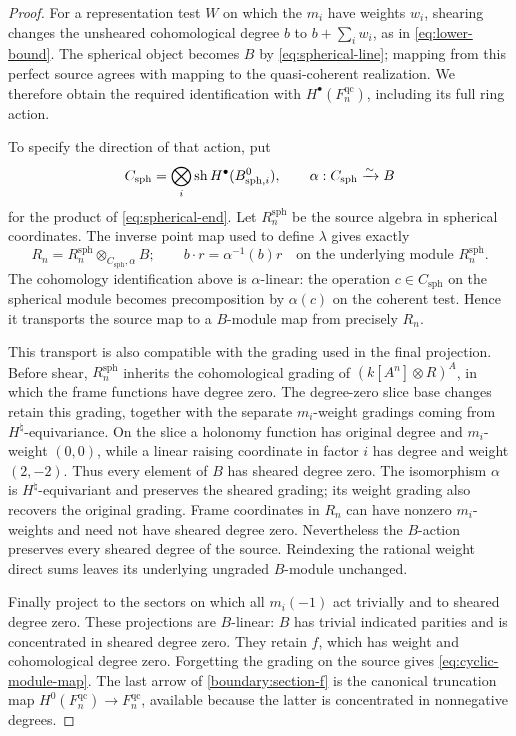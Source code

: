 \documentclass[11pt]{article}
\numberwithin{equation}{section}
\theoremstyle{definition}
\theoremstyle{remark}
\begin{document}
\begin{proof}
For a representation test $W$ on which the $m_i$ have weights $w_i$,
shearing changes the unsheared cohomological degree $b$ to
$b+\sum_iw_i$, as in \eqref{eq:lower-bound}.  The spherical object becomes
$B$ by \eqref{eq:spherical-line}; mapping from this perfect source agrees
with mapping to the quasi-coherent realization.  We therefore obtain
the required identification with $H^\bullet(F_n^{\mathrm{qc}})$,
including its full ring action.

To specify the direction of that action, put
\[
 C_{\mathrm{sph}}
   =\bigotimes_i\operatorname{sh}H^\bullet(B_{{\rm sph},i}^0),
 \qquad
 \alpha:C_{\mathrm{sph}}\xrightarrow{\sim}B
\]
for the product of \eqref{eq:spherical-end}.  Let $R_n^{\mathrm{sph}}$
be the source algebra in spherical coordinates.  The inverse point map
used to define $\lambda$ gives exactly
\[
 R_n=R_n^{\mathrm{sph}}\otimes_{C_{\mathrm{sph}},\alpha}B;
 \qquad b\cdot r=\alpha^{-1}(b)r
 \quad\text{on the underlying module }R_n^{\mathrm{sph}}.
\]
The cohomology identification above is $\alpha$-linear: the operation
$c\in C_{\mathrm{sph}}$ on the spherical module becomes precomposition
by $\alpha(c)$ on the coherent test.  Hence it transports the source
map to a $B$-module map from precisely $R_n$.

This transport is also compatible with the grading used in the final
projection.  Before shear, $R_n^{\mathrm{sph}}$ inherits the
cohomological grading of $(k[A^n]\otimes R)^A$, in which the frame
functions have degree zero.  The degree-zero slice base changes retain
this grading, together with the separate $m_i$-weight gradings coming
from $H^\natural$-equivariance.  On the slice a holonomy function has original degree and
$m_i$-weight $(0,0)$, while a linear raising coordinate in factor $i$
has degree and weight $(2,-2)$.  Thus every element of $B$ has sheared
degree zero.  The isomorphism $\alpha$ is $H^\natural$-equivariant and
preserves the sheared grading; its weight grading also recovers the
original grading.  Frame coordinates in $R_n$ can have nonzero
$m_i$-weights and need not have sheared degree zero.  Nevertheless the
$B$-action preserves every sheared degree of the source.  Reindexing
the rational weight direct sums leaves its underlying ungraded
$B$-module unchanged.

Finally project to the sectors on which all $m_i(-1)$ act trivially and
to sheared degree zero.  These projections are $B$-linear: $B$ has trivial
indicated parities and is concentrated in sheared degree zero.  They
retain $f$, which has weight and cohomological degree zero.  Forgetting
the grading on the source gives \eqref{eq:cyclic-module-map}.
The last arrow of \eqref{boundary:section-f} is the canonical truncation
map $H^0(F_n^{\mathrm{qc}})\to F_n^{\mathrm{qc}}$, available because the
latter is concentrated in nonnegative degrees.
\end{proof}
\end{document}
